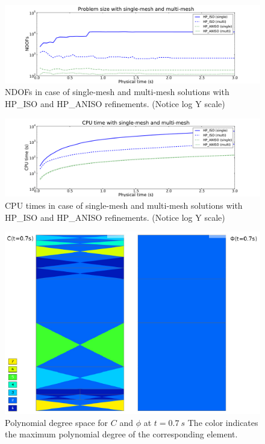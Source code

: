 \begin{figure}
  \begin{centering}
  \includegraphics[width=\columnwidth]{singlemulti_dof}
  \caption{\label{fig:singlemultidof} NDOFs in case 
  of single-mesh and multi-mesh solutions with HP\_ISO
  and HP\_ANISO refinements. (Notice log Y scale)}
  \end{centering}
\end{figure}
\begin{figure}
  \begin{centering}
  \includegraphics[width=\columnwidth]{singlemulti_cpu}
  \caption{\label{fig:singlemulticpu} CPU times in case
  of single-mesh and multi-mesh solutions with HP\_ISO
  and HP\_ANISO refinements. (Notice log Y scale)}
  \end{centering}
\end{figure}
\begin{figure}
  \begin{centering}
  \includegraphics[width=.75\columnwidth]{poly}
  \caption{\label{fig:poly} Polynomial degree space
  for $C$ and $\phi$ at $t=0.7\ s$ The color indicates
  the maximum polynomial degree of the corresponding element.}
  \end{centering}
\end{figure}

